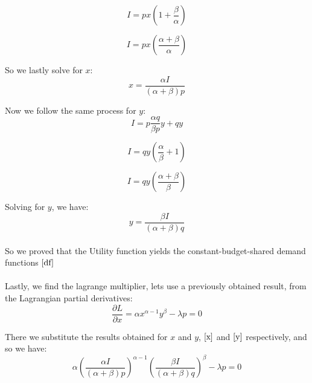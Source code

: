 \documentclass{article}
\begin{document}
  \begin{equation}
    I = px( 1 + \frac{\beta}{\alpha})
  \end{equation}

  \begin{equation}
    I = px \left( \frac{\alpha + \beta}{\alpha} \right)
  \end{equation}

So we lastly solve for $x$:
  \begin{equation}\label{x}
    x = \frac{\alpha I}{(\alpha + \beta)p}
  \end{equation}

Now we follow the same process for $y$:
  \begin{equation}
    I = p\frac{\alpha q}{\beta p}y + qy
  \end{equation}

  \begin{equation}
    I = qy \left( \frac{\alpha}{\beta} + 1 \right)
  \end{equation}

  \begin{equation}
    I = qy \left( \frac{\alpha + \beta}{\beta}\right)
  \end{equation}

Solving for $y$, we have:
  \begin{equation}\label{y}
    y = \frac{\beta I}{(\alpha + \beta)q}
  \end{equation}

\paragraph{}
So we proved that the Utility function yields the constant-budget-shared demand functions $\ref{df}$

\paragraph{}
Lastly, we find the lagrange multiplier, lets use a previously obtained result, from the Lagrangian partial derivatives:
  \begin{equation}
    \frac{\partial L}{\partial x} = \alpha x^{\alpha - 1} y^\beta - \lambda p = 0
  \end{equation}

There we substitute the results obtained for $x$ and $y$, $\ref{x}$ and $\ref{y}$ respectively, and so we have:
  \begin{equation}
    \alpha \left( \frac{\alpha I}{(\alpha + \beta)p} \right)^{\alpha - 1} \left( \frac{\beta I}{(\alpha + \beta)q} \right)^\beta - \lambda p = 0
  \end{equation}
\end{document}
